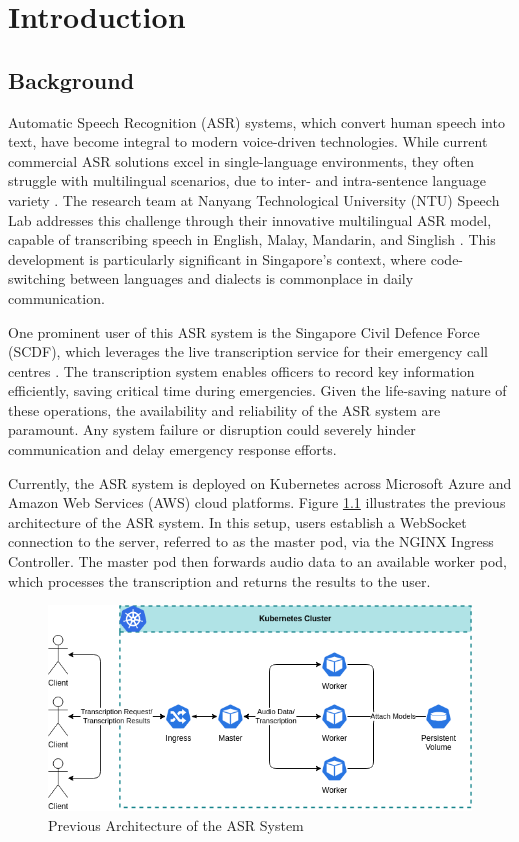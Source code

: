 \chapter{Introduction} \label{chapter:introduction}
\section{Background}

Automatic Speech Recognition (ASR) systems, which convert human speech into text, have become integral to modern voice-driven technologies. While current commercial ASR solutions excel in single-language environments, they often struggle with multilingual scenarios, due to inter- and intra-sentence language variety \cite{code_switching}. The research team at Nanyang Technological University (NTU) Speech Lab addresses this challenge through their innovative multilingual ASR model, capable of transcribing speech in English, Malay, Mandarin, and Singlish \cite{speech_lab,scdf_2}. This development is particularly significant in Singapore's context, where code-switching between languages and dialects is commonplace in daily communication.

One prominent user of this ASR system is the Singapore Civil Defence Force (SCDF), which leverages the live transcription service for their emergency call centres \cite{scdf}. The transcription system enables officers to record key information efficiently, saving critical time during emergencies. Given the life-saving nature of these operations, the availability and reliability of the ASR system are paramount. Any system failure or disruption could severely hinder communication and delay emergency response efforts.

Currently, the ASR system is deployed on Kubernetes across Microsoft Azure and Amazon Web Services (AWS) cloud platforms. Figure \ref{fig:previous_architecture} illustrates the previous architecture of the ASR system. In this setup, users establish a WebSocket connection to the server, referred to as the master pod, via the NGINX Ingress Controller. The master pod then forwards audio data to an available worker pod, which processes the transcription and returns the results to the user.

\begin{figure}[!ht]
    \centering
    \includegraphics[width=\textwidth]{figures/previous_architecture.drawio.png}
    \caption{Previous Architecture of the ASR System}
    \label{fig:previous_architecture}
\end{figure}

